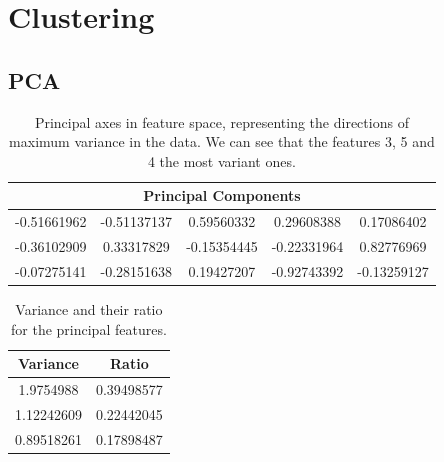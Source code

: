 %


\section{Clustering}

\subsection{PCA}

\begin{table}
	\begin{tabular}{ c c c c c }
		\hline
		\multicolumn{5}{c}{Principal Components} \\ \hline
		-0.51661962 & -0.51137137 &  0.59560332 &  0.29608388 &  0.17086402 \\ \hline
		-0.36102909 &  0.33317829 & -0.15354445 & -0.22331964 &  0.82776969 \\ \hline
		-0.07275141 & -0.28151638 &  0.19427207 & -0.92743392 & -0.13259127 \\ \hline
	\end{tabular}
	\caption{Principal axes in feature space, representing the directions of maximum variance in the data. We can see that the features 3, 5 and 4 the most variant ones.}
	\label{tab:pca_components}
\end{table}

\begin{table}
	\begin{center}
		\begin{tabular}{cc}
			\hline
			Variance & Ratio \\ \hline
			1.9754988 & 0.39498577 \\
			1.12242609 & 0.22442045 \\
			0.89518261 & 0.17898487 \\
			\hline
		\end{tabular}
		\caption{Variance and their ratio for the principal features.}
		\label{tab:pca_variance}
	\end{center}
\end{table}

